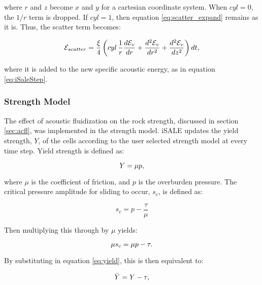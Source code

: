 where $r$ and $z$ become $x$ and $y$ for a cartesian coordinate system. When $cyl=0$, the $1/r$ term is dropped. If $cyl=1$, then equation \ref{eq:scatter_expand} remains as it is. Thus, the scatter term becomes:

\begin{equation}
\mathcal{E}_{scatter} = \frac{\xi}{4} \left(cyl\,\frac{1}{r} \frac{d \mathcal{E}_{v}}{dr} + \frac{d^{2} \mathcal{E}_{v}}{dr^{2}} + \frac{d^{2} \mathcal{E}_{v}}{dz^{2}} \right)dt,\vspace{0.2cm}
\end{equation}

where it is added to the new specific acoustic energy, as in equation \ref{eq:iSaleStep}.

\subsubsection{Strength Model \label{sec:strength}}

\begin{sloppypar}
The effect of acoustic fluidization on the rock strength, discussed in section \ref{sec:acfl}, was implemented in the \citet{collins2004modeling} strength model. iSALE updates the yield strength, $Y$, of the cells according to the user selected strength model at every time step. Yield strength is defined as:
\end{sloppypar}

\begin{equation} \label{eq:yield}
Y=\mu p, \vspace{0.2cm}
\end{equation}

where $\mu$ is the coefficient of friction, and $p$ is the overburden pressure. The critical pressure amplitude for sliding to occur, $s_{c}$, is defined as:

\begin{equation}
s_c=p -\frac{\tau}{\mu}
\end{equation}

Then multiplying this through by $\mu$ yields:

\begin{equation}
\mu s_c =\mu p - \tau. \vspace{0.2cm}
\end{equation}

By substituting in equation \ref{eq:yield}, this is then equivalent to:

\begin{equation}
\bar{Y}  =Y - \tau, \vspace{0.2cm}
\end{equation}

